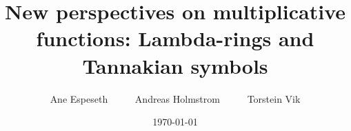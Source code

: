 \newcommand{\ktwist}[1]{\hspace{1pt} \ltimes_{#1} \hspace{1pt} }

\newcommand{\roots}[1]{{#1}\text{-roots}}
\newcommand{\powers}[1]{{#1}\text{-powers}}

\newcommand{\tdim}{\mathrm{tdim}}
\newcommand{\vdim}{\mathrm{vdim}}
\newcommand{\edim}{\mathrm{edim}}
\newcommand{\odim}{\mathrm{odim}}
\newcommand{\aug}{\mathrm{aug}}

\newcommand{\sdim}{\mathrm{sdim}}

\newcommand{\tr}{\mathrm{tr}}






\newcommand{\N}{\mathbb{N}}
\newcommand{\Z}{\mathbb{Z}}
\newcommand{\bbP}{\mathbb{P}}
\newcommand{\PP}{\mathbb{PP}}
\newcommand{\Q}{\mathbb{Q}}
\newcommand{\C}{\mathbb{C}}
\newcommand{\Fp}{\mathbb{F}_p}
\newcommand{\Fq}{\mathbb{F}_q}

\newcommand{\TS}{\mathbf{TS}}
\newcommand{\TSP}{\mathbf{TS}^{\mathbb{P}}}


\newcommand{\Spec}{\mathrm{Spec}}

\newcommand{\BD}{\mathbf{D}}

\newcommand{\defhl}[1]{\textbf{#1}}



\newcommand{\twopartdef}[4]
{
	\left\{
		\begin{array}{ll}
			#1 & \mbox{if } #2 \\
			#3 & \mbox{} #4
		\end{array}
	\right.
}

\newcommand{\threepartdef}[6]
{
	\left\{
		\begin{array}{lll}
			#1 & \mbox{if } #2 \\
			#3 & \mbox{if } #4 \\
			#5 & \mbox{} #6
		\end{array}
	\right.
}


\newcommand{\Mod}[1]{\ (\text{mod}\ #1)}

\title{New perspectives on multiplicative functions: Lambda-rings and Tannakian symbols}

\author{Ane Espeseth \ \ \ \ \ Andreas Holmstrom \ \ \ \ \ Torstein Vik}

\date{\today}
